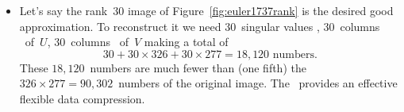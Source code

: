 \begin{example}
\begin{solution}
\begin{itemize}
\item Let's say the rank~\(30\) image of Figure~\ref{fig:euler1737rank} is the desired good approximation.  
To reconstruct it we need \(30\)~singular values \hlist{}, \(30\)~columns \hlist{}\ of~\(U\), \(30\)~columns \hlist{}\ of~\(V\) making a total of
\begin{equation*}
30+30\times326+30\times277=18,120\text{ numbers}.
\end{equation*}
These \(18,120\)~numbers are much fewer than (one fifth) the \(326\times277=90,302\)~numbers of the original image.
The \svd\ provides an effective flexible data compression.
\end{itemize}
\end{solution}
\end{example}









